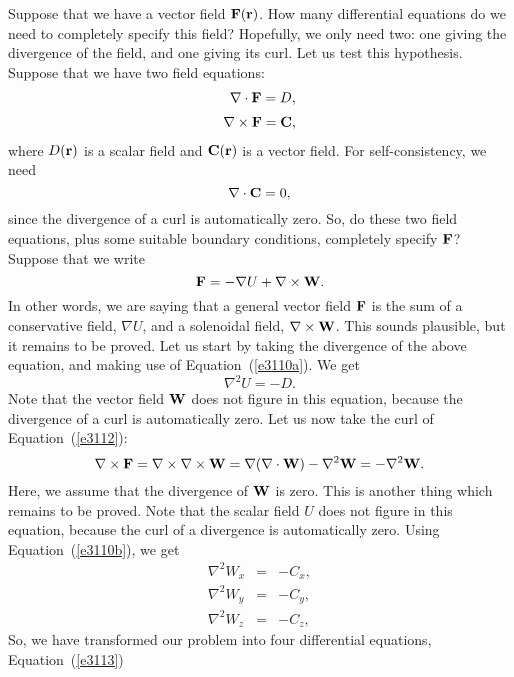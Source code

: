 Suppose that we have a vector field ${\bf F}({\bf r})$. How many differential equations
do we need to completely specify this field? Hopefully, we only need two: one
giving the divergence of the field, and one giving its curl. Let us
test this hypothesis. Suppose that we have two field equations:
\begin{eqnarray}
\nabla\cdot {\bf F} = D,\label{e3110a}\\[0.5ex]
\nabla\times{\bf F} = {\bf C},\label{e3110b}
\end{eqnarray}
where $D({\bf r})$ is a scalar field and ${\bf C}({\bf r})$ is a vector field.
For self-consistency, we need
\begin{equation}
\nabla\cdot {\bf C} = 0,
\end{equation}
since the divergence of a curl is automatically zero. So, do these
two field equations, plus some suitable boundary conditions, completely specify
${\bf F}$? Suppose that we write
\begin{equation}\label{e3112}
{\bf F} = -\nabla U +\nabla\times{\bf W}.
\end{equation}
In other words, we are saying that a general vector field ${\bf F}$ is the sum of
a conservative field, $\nabla U$, and a solenoidal field, $\nabla\times{\bf W}$.
This sounds plausible, but it remains to be proved.
Let us start by taking the divergence of the above equation, and making use of
 Equation~(\ref{e3110a}). We get
\begin{equation}\label{e3113}
\nabla^2 U = -D.
\end{equation}
Note that the vector field ${\bf W}$ does not figure in this equation, because
the divergence of a curl is automatically zero. Let us now take the curl of
Equation~(\ref{e3112}):
\begin{equation}
\nabla\times{\bf F} = \nabla\times\nabla\times{\bf W}= \nabla(\nabla\cdot{\bf W})
- \nabla^2{\bf W} = -\nabla^2 {\bf W}.
\end{equation}
Here, we assume that the divergence of ${\bf W}$ is zero. This is another thing
which remains to be proved. Note that the scalar field $U$ does not figure in
this equation, because the curl of a divergence is automatically zero.
Using Equation~(\ref{e3110b}), we
get
\begin{eqnarray}
\nabla^2 W_x &=& - C_x,\label{e3115a}\\[0.5ex]
\nabla^2 W_y &=& - C_y,\\[0.5ex]
\nabla^2 W_z &=& - C_z,\label{e3115c}
\end{eqnarray}
So, we have transformed our problem into four differential equations, Equation~(\ref{e3113})
